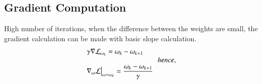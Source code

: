 \documentclass[3p,times,procedia]{elsarticle}
\begin{document}


\vspace{-0.5em}
\subsection{\textbf{Gradient Computation}}
High number of iterations, when the difference between the weights are small, the gradient calculation can be made with basic slope calculation.
\vspace{-0.7em}
\begin{equation*}
    \begin{array}{l}
         \textrm{$ \textstyle  \gamma \nabla \mathcal{L}_{\omega_{k}} = \omega_{k} - \omega_{k+1}  $} \\
        \hspace{10em} hence, \\
         \displaystyle \textrm{$  \nabla_{\omega} \mathcal{L}\big\rvert_{\omega = \omega_{k}} = \frac{\omega_{k} - \omega_{k+1}}{\gamma}$}   \\
    \end{array}
\end{equation*}
\end{document}
